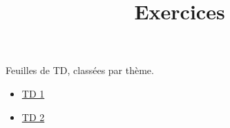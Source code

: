\documentclass[
  french,
  12pt,
]{article}
\title{Exercices}
\author{}
\date{}
\providecommand{\tightlist}{%
  \setlength{\itemsep}{0pt}\setlength{\parskip}{0pt}}
\begin{document}
\maketitle


Feuilles de TD, classées par thème.

\begin{itemize}
\tightlist
\item
  \href{td1.qmd}{TD 1}
\item
  \href{td2.qmd}{TD 2}
\end{itemize}
\end{document}
